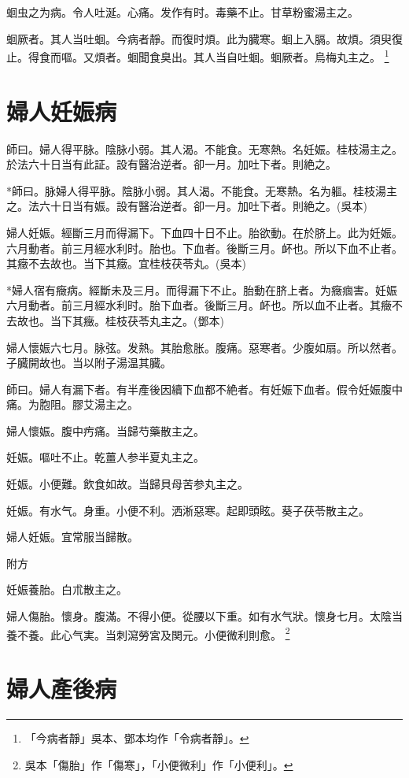 \documentclass[b5paper,twoside,zihao=-4,UTF8]{ctexbook}
\begin{document}
蛔虫之为病。令人吐涎。心痛。发作有时。毒藥不止。甘草粉蜜湯主之。

蛔厥者。其人当吐蛔。今病者靜。而復时煩。此为臓寒。蛔上入膈。故煩。須臾復止。得食而嘔。又煩者。蛔聞食臭出。其人当自吐蛔。蛔厥者。烏梅丸主之。
	\footnote{「今病者靜」吳本、鄧本均作「令病者靜」。}

\chapter{婦人妊娠病}

師曰。婦人得平脉。陰脉小弱。其人渴。不能食。无寒熱。名妊娠。桂枝湯主之。於法六十日当有此証。設有醫治逆者。卻一月。加吐下者。則絶之。

*師曰。脉婦人得平脉。陰脉小弱。其人渴。不能食。无寒熱。名为軀。桂枝湯主之。法六十日当有娠。設有醫治逆者。卻一月。加吐下者。則絶之。(吳本)

婦人妊娠。經斷三月而得漏下。下血四十日不止。胎欲動。在於脐上。此为妊娠。六月動者。前三月經水利时。胎也。下血者。後斷三月。衃也。所以下血不止者。其癥不去故也。当下其癥。宜桂枝茯苓丸。(吳本)

*婦人宿有癥病。經斷未及三月。而得漏下不止。胎動在脐上者。为癥痼害。妊娠六月動者。前三月經水利时。胎下血者。後斷三月。衃也。所以血不止者。其癥不去故也。当下其癥。桂枝茯苓丸主之。(鄧本)

婦人懷娠六七月。脉弦。发熱。其胎愈胀。腹痛。惡寒者。少腹如扇。所以然者。子臓開故也。当以附子湯温其臓。

師曰。婦人有漏下者。有半產後因續下血都不絶者。有妊娠下血者。假令妊娠腹中痛。为胞阻。膠艾湯主之。

婦人懷娠。腹中㽲痛。当歸芍藥散主之。

妊娠。嘔吐不止。乾薑人参半夏丸主之。

妊娠。小便難。飲食如故。当歸貝母苦参丸主之。

妊娠。有水气。身重。小便不利。洒淅惡寒。起即頭眩。葵子茯苓散主之。

婦人妊娠。宜常服当歸散。

附方

妊娠養胎。白朮散主之。

婦人傷胎。懷身。腹滿。不得小便。從腰以下重。如有水气狀。懷身七月。太陰当養不養。此心气実。当刺瀉勞宮及関元。小便{微}利則愈。
	\footnote{吳本「傷胎」作「傷寒」，「小便微利」作「小便利」。}

\chapter{婦人產後病}
\end{document}
